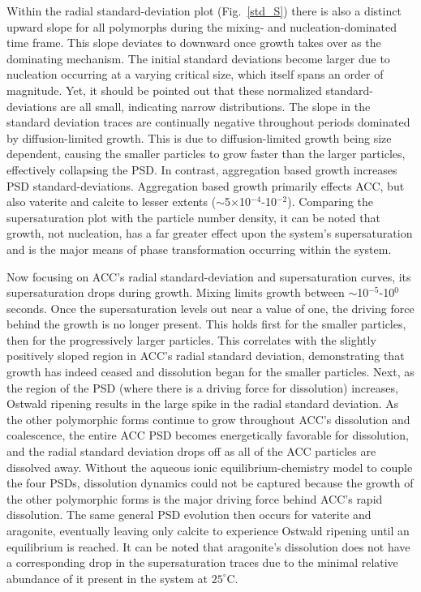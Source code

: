 \documentclass[preprint,3p,a4paper,times,12pt,authoryear]{elsarticle}
\begin{document}
Within the radial standard-deviation plot (Fig.~\ref{std_S}) there is also a distinct upward slope for all polymorphs during the mixing- and nucleation-dominated time frame.  This slope deviates to downward once growth takes over as the dominating mechanism.  The initial standard deviations become larger due to nucleation occurring at a varying critical size, which itself spans an order of magnitude.  Yet, it should be pointed out that these normalized standard-deviations are all small, indicating narrow distributions.  The slope in the standard deviation traces are continually negative throughout periods dominated by diffusion-limited growth.  This is due to diffusion-limited growth being size dependent, causing the smaller particles to grow faster than the larger particles, effectively collapsing the PSD.  In contrast, aggregation based growth increases PSD standard-deviations.  Aggregation based growth primarily effects ACC, but also vaterite and calcite to lesser extents ($\sim$5$\times$10$^{-4}$-10$^{-2}$). Comparing the supersaturation plot with the particle number density, it can be noted that growth, not nucleation, has a far greater effect upon the system's supersaturation and is the major means of phase transformation occurring within the system.

Now focusing on ACC's radial standard-deviation and supersaturation curves, its supersaturation drops during growth.  Mixing limits growth between $\sim$10$^{-5}$-10$^{0}$ seconds.  Once the supersaturation levels out near a value of one, the driving force behind the growth is no longer present.  This holds first for the smaller particles, then for the progressively larger particles.  This correlates with the slightly positively sloped region in ACC's radial standard deviation, demonstrating that growth has indeed ceased and dissolution began for the smaller particles.  Next, as the region of the PSD (where there is a driving force for dissolution) increases, Ostwald ripening results in the large spike in the radial standard deviation.   As the other polymorphic forms continue to grow throughout ACC's dissolution and coalescence, the entire ACC PSD becomes energetically favorable for dissolution, and the radial standard deviation drops off as all of the ACC particles are dissolved away.  Without the aqueous ionic equilibrium-chemistry model to couple the four PSDs, dissolution dynamics could not be captured because the growth of the other polymorphic forms is the major driving force behind ACC's rapid dissolution.  The same general PSD evolution then occurs for vaterite and aragonite, eventually leaving only calcite to experience Ostwald ripening until an equilibrium is reached.  It can be noted that aragonite's dissolution does not have a corresponding drop in the supersaturation traces due to the minimal relative abundance of it present in the system at $25^\circ$C. 
\end{document}

